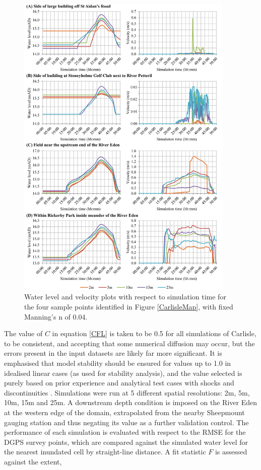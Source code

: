 \begin{figure}[tpb]
	\centering
	\includegraphics[width=0.93\textwidth]{carlisle-figures/Figure6.png}
	\caption{Water level and velocity plots with respect to simulation time for the four sample points identified in Figure \ref{CarlisleMap}, with fixed Manning's n of 0.04.}
	\label{TimeseriesPlots}
\end{figure}

The value of \(C\) in equation \eqref{CFL} is taken to be 0.5 for all simulations of Carlisle, to be consistent, and accepting that some numerical diffusion may occur, but the errors present in the input datasets are likely far more significant. It is emphasised that model stability should be ensured for values up to 1.0 in idealised linear cases (as used for stability analysis), and the value selected is purely based on prior experience and analytical test cases with shocks and discontinuities \citep{Liang2009c}. Simulations were run at 5 different spatial resolutions: 2m, 5m, 10m, 15m and 25m. A downstream depth condition is imposed on the River Eden at the western edge of the domain, extrapolated from the nearby Sheepmount gauging station and thus negating its value as a further validation control. The performance of each simulation is evaluated with respect to the RMSE for the DGPS survey points, which are compared against the simulated water level for the nearest inundated cell by straight-line distance. A fit statistic \(F\) is assessed against the extent, 

